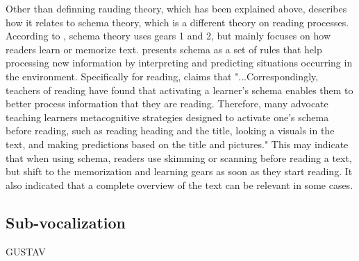 Other than definning rauding theory, which has been explained above, \cite{carver_reading_1992} describes how it relates to schema theory, which is a different theory on reading processes. According to \cite{carver_reading_1992}, schema theory uses gears 1 and 2, but mainly focuses on how readers learn or memorize text. \cite{widmayer_schema_2005} presents schema as a set of rules that help processing new information by interpreting and predicting situations occurring in the environment. Specifically for reading, \cite{widmayer_schema_2005} claims that "...Correspondingly, teachers of reading have found that activating a learner's schema enables them to better process information that they are reading. Therefore, many advocate teaching learners metacognitive strategies designed to activate one's schema before reading, such as reading heading and the title, looking a visuals in the text, and making predictions based on the title and pictures." This may indicate that when using schema, readers use skimming or scanning before reading a text, but shift to the memorization and learning gears as soon as they start reading. It also indicated that a complete overview of the text can be relevant in some cases.


\subsection{Sub-vocalization}
GUSTAV